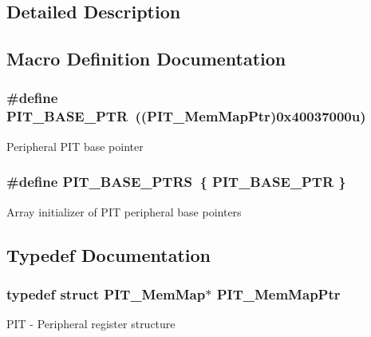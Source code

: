 \subsection{Detailed Description}


\subsection{Macro Definition Documentation}
\hypertarget{group___p_i_t___peripheral_ga70be45f58402a8e6d2ce4df7b23aa41c}{}
\subsubsection[{P\+I\+T\+\_\+\+B\+A\+S\+E\+\_\+\+P\+T\+R}]{\setlength{\rightskip}{0pt plus 5cm}\#define P\+I\+T\+\_\+\+B\+A\+S\+E\+\_\+\+P\+T\+R~(({\bf P\+I\+T\+\_\+\+Mem\+Map\+Ptr})0x40037000u)}\label{group___p_i_t___peripheral_ga70be45f58402a8e6d2ce4df7b23aa41c}
Peripheral P\+I\+T base pointer \hypertarget{group___p_i_t___peripheral_ga403e0ed71b80cfe3e085fe6b56b5eff0}{}
\subsubsection[{P\+I\+T\+\_\+\+B\+A\+S\+E\+\_\+\+P\+T\+R\+S}]{\setlength{\rightskip}{0pt plus 5cm}\#define P\+I\+T\+\_\+\+B\+A\+S\+E\+\_\+\+P\+T\+R\+S~\{ {\bf P\+I\+T\+\_\+\+B\+A\+S\+E\+\_\+\+P\+T\+R} \}}\label{group___p_i_t___peripheral_ga403e0ed71b80cfe3e085fe6b56b5eff0}
Array initializer of P\+I\+T peripheral base pointers 

\subsection{Typedef Documentation}
\hypertarget{group___p_i_t___peripheral_ga4efe9d2676c775562cb282254af9a937}{}
\subsubsection[{P\+I\+T\+\_\+\+Mem\+Map\+Ptr}]{\setlength{\rightskip}{0pt plus 5cm}typedef struct {\bf P\+I\+T\+\_\+\+Mem\+Map}$\ast$ {\bf P\+I\+T\+\_\+\+Mem\+Map\+Ptr}}\label{group___p_i_t___peripheral_ga4efe9d2676c775562cb282254af9a937}
P\+I\+T -\/ Peripheral register structure 